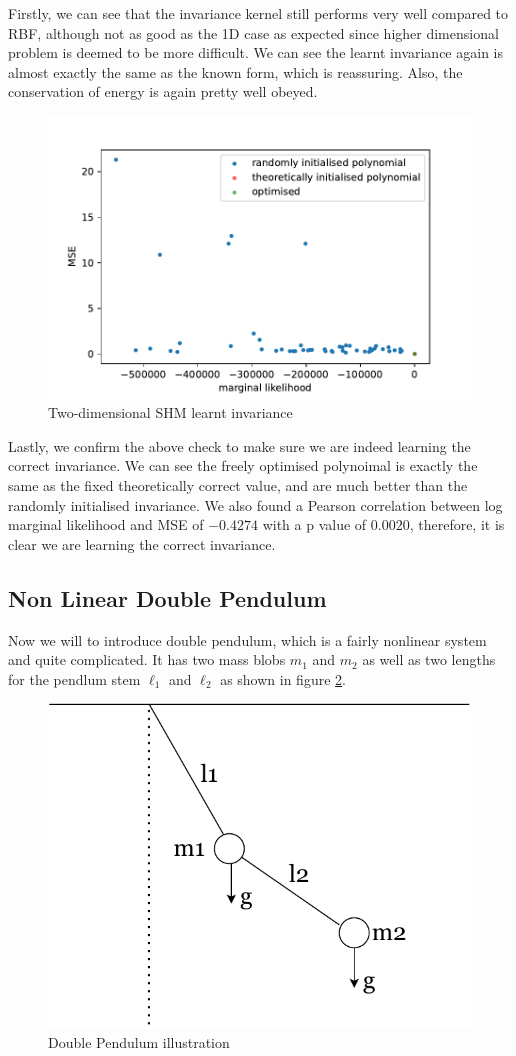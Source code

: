 \documentclass{statsmsc}
\begin{document}
Firstly, we can see that the invariance kernel still performs very well compared to RBF, although not as good as the 1D case as expected since higher dimensional problem is deemed to be more difficult.
We can see the learnt invariance again is almost exactly the same as the known form, which is reassuring.
Also, the conservation of energy is again pretty well obeyed.

\begin{figure}[H] 
  \includegraphics[width=0.8\linewidth]{../codes/figures/shm_2d_polynomial.pdf}
  \centering
  \caption{Two-dimensional SHM learnt invariance}
  \label{fig:shm_2d_poly}
\end{figure}

Lastly, we confirm the above check to make sure we are indeed learning the correct invariance.
We can see the freely optimised polynoimal is exactly the same as the fixed theoretically correct value, and are much better than the randomly initialised invariance. 
We also found a Pearson correlation between log marginal likelihood and MSE of $-0.4274$ with a p value of $0.0020$, therefore, it is clear we are learning the correct invariance. 

\subsection{Non Linear Double Pendulum}
Now we will to introduce double pendulum, which is a fairly nonlinear system and quite complicated. 
It has two mass blobs $m_1$ and $m_2$ as well as two lengths for the pendlum stem $\ell_1$ and $\ell_2$ as shown in figure \ref{fig:double_pendulum_diagram}.

\begin{figure}[H]
        \centering
        \includegraphics[width=0.4\linewidth]{../figures/doublependulum.pdf}
        \caption{Double Pendulum illustration}
        \label{fig:double_pendulum_diagram}
\end{figure}
\end{document}

